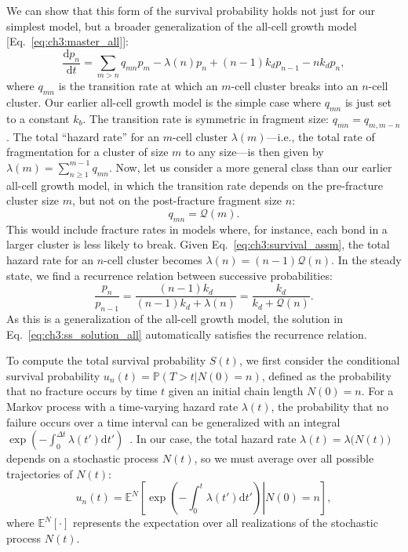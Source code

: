 We can show that this form of the survival probability holds not just for our simplest model, but a broader generalization of the all-cell growth model [Eq.~\eqref{eq:ch3:master_all}]:
\begin{equation}\label{eq:ch3:master_survival}
    \frac{\mathrm{d}p_n}{\mathrm{d}t}=\sum_{m>n}q_{mn} p_m - \lambda(n) p_n  + (n-1)k_d p_{n-1} - nk_d p_n,
\end{equation}
where $q_{mn}$ is the transition rate at which an $m$-cell cluster breaks into an $n$-cell cluster. Our earlier all-cell growth model is the simple case where $q_{mn}$ is just set to a constant $k_b$. The transition rate is symmetric in fragment size: $q_{mn}=q_{m,m-n}$. The total ``hazard rate'' for an $m$-cell cluster $\lambda(m)$---i.e., the total rate of fragmentation for a cluster of size $m$ to any size---is then given by $\lambda(m) = \sum_{n\geqslant 1}^{m-1}q_{mn}$. Now, let us consider a more general class than our earlier all-cell growth model, in which the transition rate depends on the pre-fracture cluster size $m$, but not on the post-fracture fragment size $n$:
\begin{equation}\label{eq:ch3:survival_assm}
    q_{mn}=\mathcal{Q}(m).
\end{equation}
This would include fracture rates in models where, for instance, each bond in a larger cluster is less likely to break. Given Eq.~\eqref{eq:ch3:survival_assm}, the total hazard rate for an $n$-cell cluster becomes $\lambda(n)=(n-1)\mathcal{Q}(n)$. In the steady state, we find a recurrence relation between successive probabilities:
\begin{equation}\label{eq:ch3:recurrence}
    \frac{p_n}{p_{n-1}}=\frac{(n-1)k_d}{(n-1)k_d + \lambda(n)}=\frac{k_d}{k_d+\mathcal{Q}(n)}.
\end{equation}
As this is a generalization of the all-cell growth model, the solution in Eq.~\eqref{eq:ch3:ss_solution_all} automatically satisfies the recurrence relation.

To compute the total survival probability $S(t)$, we first consider the conditional survival probability $u_n(t)=\mathbb{P}(T>t|N(0)=n)$, defined as the probability that no fracture occurs by time $t$ given an initial chain length $N(0)=n$. For a Markov process with a time-varying hazard rate $\lambda(t)$, the probability that no failure occurs over a time interval can be generalized with an integral $\exp\left(-\int_0^{\Delta t}\lambda(t')\mathrm{d}t'\right)$~\cite{kalbfleisch2002statistical}. In our case, the total hazard rate $\lambda(t)=\lambda\bm{(}N(t)\bm{)}$ depends on a stochastic process $N(t)$, so we must average over all possible trajectories of $N(t)$:
\begin{equation}
\label{eq:ch3:conditional_average}
u_n(t)=\mathbb{E}^N\left[\left.\exp\left(-\int_0^t\lambda(t')\mathrm{d}t'\right)\right|N(0)=n\right],
\end{equation}
where $\mathbb{E}^N[\cdot]$ represents the expectation over all realizations of the stochastic process $N(t)$.


